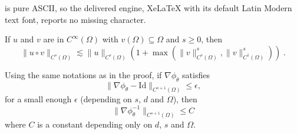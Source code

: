 \documentclass[10pt,a4paper]{amsart}
\begin{document}
is pure ASCII, so the delivered engine, XeLaTeX with its default Latin Modern text font, reports no missing character.
\begin{lemma}
\label{lemma:holder_composition}
    If $u$ and $v$ are in $C^{\infty}(\Omega)$ with $v(\Omega) \subseteq \Omega$ and $s \geq 0$, then 
    \begin{equation}
        \| u \circ v\|_{C^{s}(\Omega)} \lesssim \| u \|_{C^{s}(\Omega)} (1 + \max (\| v\|_{C^{s}(\Omega)}^s, \| v\|_{C^{1}(\Omega)}^s)) \;.
    \end{equation} 
\end{lemma}

\begin{lemma}
    \label{lemma:holder_inversion}
    Using the same notations as in the proof, if $\nabla \phi_\theta$ satisfies
    \begin{equation}
    \|\nabla \phi_\theta - \mathrm{Id}\|_{C^{s+1}(\Omega)} \leq \epsilon,
\end{equation}
for a small enough $\epsilon$ (depending on $s$, $d$ and $\Omega$), then 
\begin{equation}
    \|\nabla \phi_\theta^{-1}\|_{C^{s+1}(\Omega)} \leq C
\end{equation}
where $C$ is a constant depending only on $d$, $s$ and $\Omega$.
\end{lemma}
\end{document}
